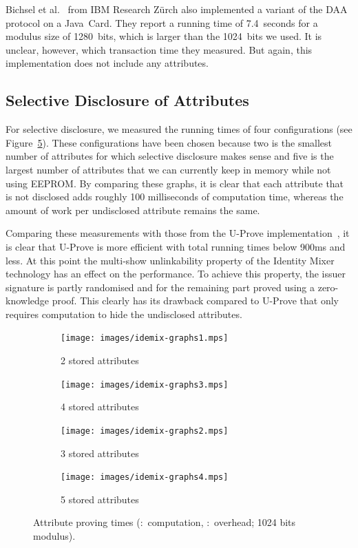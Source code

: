 Bichsel et al.~\cite{BichselCGS2009} from IBM Research Z\"urch also implemented
a variant of the DAA protocol on a Java~Card. They report a running time of
7.4~seconds for a modulus size of 1280~bits, which is larger than the 1024~bits
we used. It is unclear, however, which transaction time they measured. But
again, this implementation does not include any attributes.

\subsection{Selective Disclosure of Attributes}

For selective disclosure, we measured the running times of four configurations
(see Figure~\ref{fig:proving}). These configurations have been chosen because
two is the smallest number of attributes for which selective disclosure makes
sense and five is the largest number of attributes that we can currently keep in
memory while not using EEPROM. By comparing these graphs, it is clear that each
attribute that is not disclosed adds roughly 100 milliseconds of computation
time, whereas the amount of work per undisclosed attribute remains the same.

Comparing these measurements with those from the U-Prove
implementation~\cite{MostowskiVullers11}, it is clear that U-Prove is more
efficient with total running times below 900ms and less. At this point the
multi-show unlinkability property of the Identity Mixer technology has an effect
on the performance. To achieve this property, the issuer signature is partly
randomised and for the remaining part proved using a zero-knowledge proof. This
clearly has its drawback compared to U-Prove that only requires computation to
hide the undisclosed attributes.

\begin{figure}[ht]
  \centering
  \begin{subfigure}[b]{0.45\textwidth}
    \texttt{[image: images/idemix-graphs1.mps]}
    \caption{2 stored attributes}
    \label{fig:2attr-sle78}
  \end{subfigure}
  \begin{subfigure}[b]{0.45\textwidth}
    \texttt{[image: images/idemix-graphs3.mps]}
    \caption{4 stored attributes}
    \label{fig:4attr-sle78}
  \end{subfigure}

  \begin{subfigure}[b]{0.45\textwidth}
    \texttt{[image: images/idemix-graphs2.mps]}
    \caption{3 stored attributes}
    \label{fig:3attr-sle78}
  \end{subfigure}
  \begin{subfigure}[b]{0.45\textwidth}
    \texttt{[image: images/idemix-graphs4.mps]}
    \caption{5 stored attributes}
    \label{fig:5attr-sle78}
  \end{subfigure}

  \caption[Attribute proving times.]{
    Attribute proving times
    (:~computation,
      :~overhead; 1024 bits modulus).}
  \label{fig:proving}
\end{figure}

